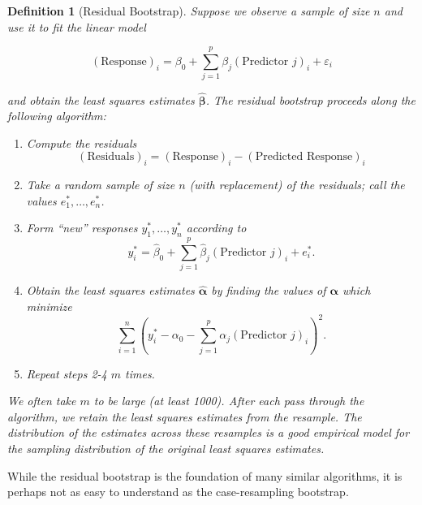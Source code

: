 \documentclass[
]{book}
\providecommand{\tightlist}{%
  \setlength{\itemsep}{0pt}\setlength{\parskip}{0pt}}
\theoremstyle{plain}
\theoremstyle{mydefn}
\newtheorem{definition}{Definition}[chapter]
\theoremstyle{myexmpl}
\theoremstyle{remark}
\begin{document}
\begin{definition}[Residual Bootstrap]
Suppose we observe a sample of size \(n\) and use it to fit the linear model

\[(\text{Response})_i = \beta_0 + \sum_{j=1}^{p} \beta_j (\text{Predictor } j)_i + \varepsilon_i\]

and obtain the least squares estimates \(\widehat{\boldsymbol{\beta}}\). The residual bootstrap proceeds along the following algorithm:

\begin{enumerate}
\def\labelenumi{\arabic{enumi}.}
\tightlist
\item
  Compute the residuals
  \[(\text{Residuals})_i = (\text{Response})_i - (\text{Predicted Response})_i\]
\item
  Take a random sample of size \(n\) (with replacement) of the residuals; call the values \(e_1^*, \dotsc, e_n^*\).
\item
  Form ``new'' responses \(y_1^*, \dotsc, y_n^*\) according to
  \[y_i^* = \widehat{\beta}_0 + \sum_{j=1}^{p} \widehat{\beta}_j (\text{Predictor } j)_i + e_i^*.\]
\item
  Obtain the least squares estimates \(\widehat{\boldsymbol{\alpha}}\) by finding the values of \(\boldsymbol{\alpha}\) which minimize
  \[\sum_{i=1}^{n} \left(y_i^* - \alpha_0 - \sum_{j=1}^{p} \alpha_j (\text{Predictor } j)_i\right)^2.\]
\item
  Repeat steps 2-4 \(m\) times.
\end{enumerate}

We often take \(m\) to be large (at least 1000). After each pass through the algorithm, we retain the least squares estimates from the resample. The distribution of the estimates across these resamples is a good empirical model for the sampling distribution of the original least squares estimates.
\end{definition}

While the residual bootstrap is the foundation of many similar algorithms, it is perhaps not as easy to understand as the case-resampling bootstrap.
\end{document}
